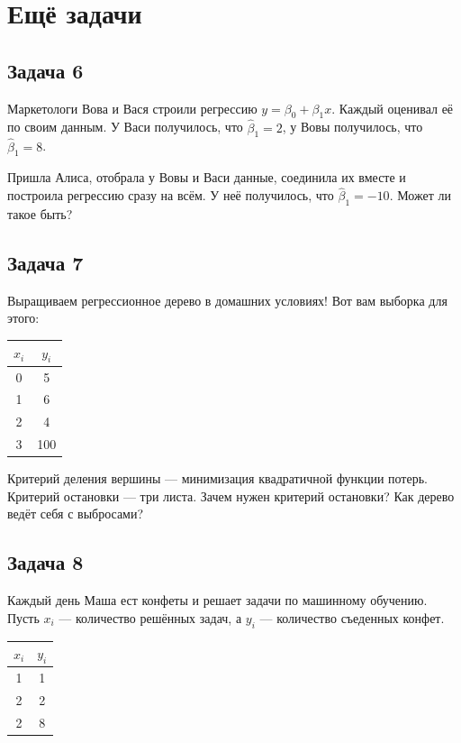 \documentclass[12pt, a4paper, oneside]{article}
\begin{document}
\section*{Ещё задачи}

\subsection*{Задача 6}

Маркетологи Вова и Вася строили регрессию $y = \beta_0 + \beta_1 x$. Каждый оценивал её по своим данным. У Васи получилось, что $\hat \beta_1 = 2$, у Вовы получилось, что $\hat \beta_1 = 8$.

Пришла Алиса, отобрала у Вовы и Васи данные, соединила их вместе и построила регрессию сразу на всём. У неё получилось, что $\hat \beta_1 = -10$. Может ли такое быть?

\subsection*{Задача 7}

Выращиваем регрессионное дерево в домашних условиях! Вот вам выборка для этого: 

\begin{center}
	\begin{tabular}{c|c}
		\hline
		$x_i$ & $y_i$ \\
		\hline
		0 & 5 \\
		1 &  6\\
		2 & 4 \\
		3 & 100 \\
	\end{tabular}
\end{center}

Критерий деления вершины --- минимизация квадратичной функции потерь. Критерий остановки --- три листа.  Зачем нужен критерий остановки? Как дерево ведёт себя с выбросами? 

\subsection*{Задача 8}

Каждый день Маша ест конфеты и решает задачи по машинному обучению. Пусть $x_i$ — количество решённых задач, а $y_i$ — количество съеденных конфет.

\begin{center}
\begin{tabular}{c|c}
	\hline
	$x_i$ & $y_i$ \\
	\hline
	1 & 1 \\
	2 & 2 \\
	2 & 8 \\
\end{tabular}
\end{center}
\end{document}

